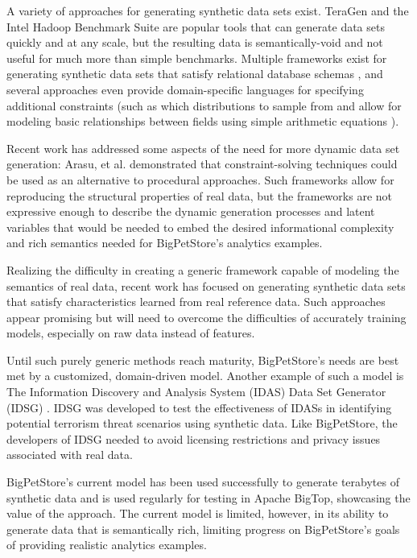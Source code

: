 A variety of approaches for generating synthetic data sets exist.  TeraGen and the Intel Hadoop Benchmark Suite \cite{Huang2010} are popular tools that can generate data sets quickly and at any scale, but the resulting data is semantically-void and not useful for much more than simple benchmarks.  Multiple frameworks exist for generating synthetic data sets that satisfy relational database schemas \cite{Ghazal2013,Rabl2011a,Frank2012,Rabl2011,Gray1994,Bruno2005,Hoag2007}, and several approaches even provide domain-specific languages \cite{LogSynth,Bruno2005,Hoag2007} for specifying additional constraints (such as which distributions to sample from and allow for modeling basic relationships between fields using simple arithmetic equations \cite{Alexandrov2012}).

Recent work has addressed some aspects of the need for more dynamic data set generation: Arasu, et al. \cite{Arasu2011} demonstrated that constraint-solving techniques could be used as an alternative to procedural approaches. Such frameworks allow for reproducing the structural properties of real data, but the frameworks are not expressive enough to describe the dynamic generation processes and latent variables that would be needed to embed the desired informational complexity and rich semantics needed for BigPetStore's analytics examples.

Realizing the difficulty in creating a generic framework capable of modeling the semantics of real data, recent work \cite{Alexandrov2013} has focused on generating synthetic data sets that satisfy characteristics learned from real reference data. Such approaches appear promising but will need to overcome the difficulties of accurately training models, especially on raw data instead of features.

Until such purely generic methods reach maturity, BigPetStore's needs are best met by a customized, domain-driven model. Another example of such a model is The Information Discovery and Analysis System (IDAS) Data Set Generator (IDSG) \cite{Jeske2005,Lin2006}. IDSG was developed to test the effectiveness of IDASs in identifying potential terrorism threat scenarios using synthetic data.  Like BigPetStore, the developers of IDSG needed to avoid licensing restrictions and privacy issues associated with real data.

BigPetStore's current model has been used successfully to generate terabytes of synthetic data and is used regularly for testing in Apache BigTop, showcasing the value of the approach.  The current model is limited, however, in its ability to generate data that is semantically rich, limiting progress on BigPetStore's goals of providing realistic analytics examples.

